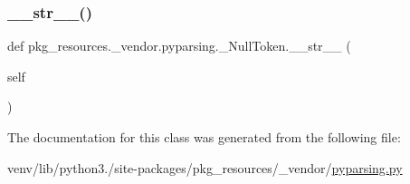 \subsubsection{\texorpdfstring{\+\_\+\+\_\+str\+\_\+\+\_\+()}{\_\_str\_\_()}}
{\footnotesize\ttfamily def pkg\+\_\+resources.\+\_\+vendor.\+pyparsing.\+\_\+\+Null\+Token.\+\_\+\+\_\+str\+\_\+\+\_\+ (\begin{DoxyParamCaption}\item[{}]{self }\end{DoxyParamCaption})}



The documentation for this class was generated from the following file\+:\begin{DoxyCompactItemize}
\item 
venv/lib/python3./site-\/packages/pkg\+\_\+resources/\+\_\+vendor/\hyperlink{pkg__resources_2__vendor_2pyparsing_8py}{pyparsing.\+py}\end{DoxyCompactItemize}
